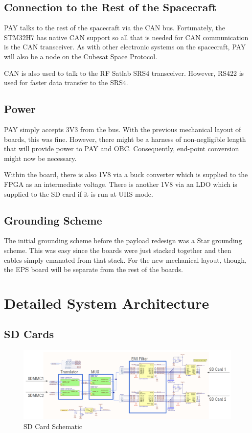 \documentclass[12pt,a4paper]{article}
\begin{document}
    \subsection{Connection to the Rest of the Spacecraft}
    PAY talks to the rest of the spacecraft via the CAN bus. Fortunately, the STM32H7 
    has native CAN support so all that is needed for CAN communication is the CAN 
    transceiver. As with other electronic systems on the spacecraft, PAY will also be 
    a node on the Cubesat Space Protocol.

    CAN is also used to talk to the RF Satlab SRS4 transceiver. However, RS422 is used for faster 
    data transfer to the SRS4. 
    \subsection{Power}
    PAY simply accepts 3V3 from the bus. With the previous mechanical layout of 
    boards, this was fine. However, there might be a harness of non-negligible 
    length that will provide power to PAY and OBC. Consequently, end-point conversion 
    might now be necessary. 

    Within the board, there is also 1V8 via a buck converter which is supplied to 
    the FPGA as an intermediate voltage. There is another 1V8 via an LDO which is 
    supplied to the SD card if it is run at UHS mode. 
    \subsection{Grounding Scheme}
    The initial grounding scheme before the payload redesign was a Star grounding 
    scheme. This was easy since the boards were just stacked together and then 
    cables simply emanated from that stack. For the new mechanical layout, though, 
    the EPS board will be separate from the rest of the boards. 

    \section{Detailed System Architecture}\label{sec:Det_Sys_Arc}
    \subsection{SD Cards}
    \begin{figure}[H]
        \centering
        \includegraphics[width=0.98\linewidth]{../figures/SD_schematic_annotated.png}
        \caption{SD Card Schematic}
    \end{figure}
\end{document}
